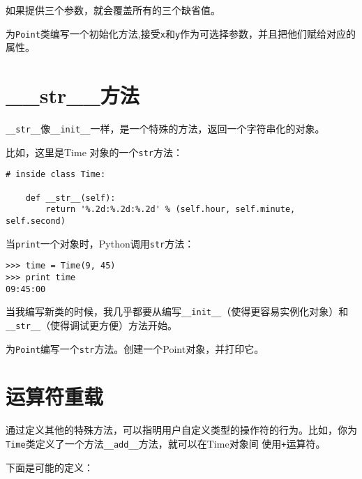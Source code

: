 如果提供三个参数，就会覆盖所有的三个缺省值。

\begin{ex}

为{\tt Point}类编写一个初始化方法,接受{\tt x}和{\tt y}作为可选择参数，并且把他们赋给对应的属性。
\end{ex}

\section{\_\_str\_\_方法}


\verb"__str__"像\verb"__init__"一样，是一个特殊的方法，返回一个字符串化的对象。


比如，这里是Time 对象的一个{\tt str}方法：

\beforeverb
\begin{verbatim}
# inside class Time:

    def __str__(self):
        return '%.2d:%.2d:%.2d' % (self.hour, self.minute, self.second)
\end{verbatim}
\afterverb
%

当{\tt print}一个对象时，Python调用{\tt str}方法：


\beforeverb
\begin{verbatim}
>>> time = Time(9, 45)
>>> print time
09:45:00
\end{verbatim}
\afterverb

当我编写新类的时候，我几乎都要从编写\verb"__init__"（使得更容易实例化对象）和\verb"__str__"（使得调试更方便）方法开始。

\begin{ex}
为{\tt Point}编写一个{\tt str}方法。创建一个Point对象，并打印它。
\end{ex}

\section{运算符重载}
\label{operator overloading 运算符重载}

通过定义其他的特殊方法，可以指明用户自定义类型的操作符的行为。比如，你为{\tt Time}类定义了一个方法\verb"__add__"方法，就可以在Time对象间
使用{\tt +}运算符。

下面是可能的定义：


